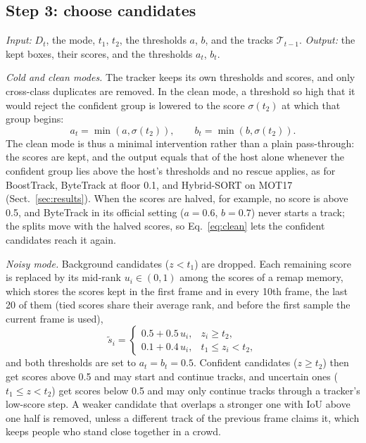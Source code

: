 \documentclass[pdflatex,sn-mathphys-num,iicol]{sn-jnl}
\begin{document}
\subsection{Step 3: choose candidates}\label{sec:choice}
\emph{Input:} $D_t$, the mode, $t_1$, $t_2$, the thresholds $a$, $b$, and the tracks
$\mathcal{T}_{t-1}$. \emph{Output:} the kept boxes, their scores, and the thresholds $a_t$, $b_t$.

\emph{Cold and clean modes.} The tracker keeps its own thresholds and scores, and only cross-class
duplicates are removed. In the clean mode, a threshold so high that it would reject the confident
group is lowered to the score $\sigma(t_2)$ at which that group begins:
\begin{equation}
a_t=\min\!\left(a,\sigma(t_2)\right),\qquad b_t=\min\!\left(b,\sigma(t_2)\right).
\label{eq:clean}
\end{equation}
The clean mode is thus a minimal intervention rather than a plain pass-through: the scores are
kept, and the output equals that of the host alone whenever the confident group lies above the
host's thresholds and no rescue applies, as for BoostTrack, ByteTrack at floor 0.1, and Hybrid-SORT
on MOT17 (Sect.~\ref{sec:results}). When the scores are halved, for example, no score is above 0.5,
and ByteTrack in its official setting ($a=0.6$, $b=0.7$) never starts a track; the splits move with
the halved scores, so Eq.~\eqref{eq:clean} lets the confident candidates reach it again.

\emph{Noisy mode.} Background candidates ($z<t_1$) are dropped. Each remaining score is
replaced by its mid-rank $u_i\in(0,1)$ among the scores of a remap memory, which stores the scores
kept in the first frame and in every 10th frame, the last 20 of them (tied scores share their
average rank, and before the first sample the current frame is used),
\begin{equation}
\tilde{s}_i=
\begin{cases}
0.5+0.5\,u_i, & z_i\ge t_2,\\
0.1+0.4\,u_i, & t_1\le z_i<t_2,
\end{cases}
\label{eq:remap}
\end{equation}
and both thresholds are set to $a_t=b_t=0.5$. Confident candidates ($z\ge t_2$) then get scores above 0.5
and may start and continue tracks, and uncertain ones ($t_1\le z<t_2$) get scores below 0.5 and may
only continue tracks through a tracker's low-score step. A weaker
candidate that overlaps a stronger one with IoU above one half is removed, unless a different track
of the previous frame claims it, which keeps people who stand close together in a crowd.
\end{document}

